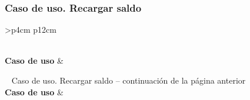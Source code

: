 \subsubsection{Caso de uso. Recargar saldo} \label{sec:cu_recarga-saldo}
\begin{longtable}{
    >{}p{4cm}
    p{12cm}
    }
    \caption{Caso de uso. Recargar saldo} \label{table:cu_recarga-saldo} \\
    \toprule
    \textbf{Caso de uso} &  \\
    \endfirsthead
    
    {{ \tablename\ \thetable{} Caso de uso. Recargar saldo -- continuación de la página anterior}} \\
    \toprule
    \textbf{Caso de uso} &  \\
    \midrule
    \endhead
    
    \midrule
     \\ 
    \endfoot
    
    \bottomrule
    \endlastfoot
    

\end{longtable}

